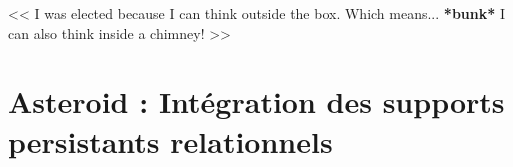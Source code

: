 \begin{savequote}[6cm]
<< I was elected because I can think outside the box. 
Which means... \textbf{*bunk*} I can also think inside a chimney! >>
\end{savequote}

\chapter{Asteroid : Intégration des supports persistants relationnels}\label{chap:contrib:asteroid}
\chaptertoc




